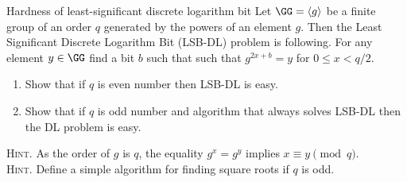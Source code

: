 \documentclass{crypto-exercise}
\author{Sven Laur}
\begin{document}
\begin{exercise}{Hardness of least-significant discrete logarithm bit}
  Let $\GG=\langle g\rangle$ be a finite group of an order $q$
  generated by the powers of an element $g$. Then the Least Significant Discrete
  Logarithm Bit (LSB-DL) problem is following. For any element $y\in\GG$ find a bit $b$ such that
  such that $g^{2x+b}=y$ for $0\leq x < q/2$.
  \begin{enumerate}
  \item Show that if $q$ is even number then LSB-DL is easy.
  \item Show that if $q$ is odd number and algorithm that always solves LSB-DL then the DL
    problem is easy.
  \end{enumerate}
  \textsc{Hint.} As the order of $g$ is $q$, the equality $g^x=g^y$ implies $x\equiv y \pmod q$.\\
  \textsc{Hint.} Define a simple algorithm for finding square roots if $q$ is odd.

\end{exercise}


\begin{solution}
  

\end{solution}
\end{document}

